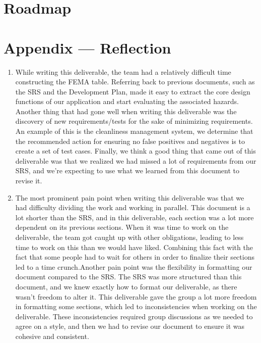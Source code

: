 \documentclass{article}
\begin{document}
\section{Roadmap}


\newpage{}

\section*{Appendix --- Reflection}

\begin{enumerate}
    \item While writing this deliverable, the team had a relatively difficult time constructing the FEMA table. Referring back to previous documents, such as the SRS and the Development Plan, made it easy to extract the core design functions of our application and start evaluating the associated hazards. Another thing that had gone well when writing this deliverable was the discovery of new requirements/tests for the sake of minimizing requirements. An example of this is the cleanliness management system, we determine that the recommended action for ensuring no false positives and negatives is to create a set of test cases. Finally, we think a good thing that came out of this deliverable was that we realized we had missed a lot of requirements from our SRS, and we're expecting to use what we learned from this document to revise it.
    
    \item The most prominent pain point when writing this deliverable was that we had difficulty dividing the work and working in parallel. This document is a lot shorter than the SRS, and in this deliverable, each section was a lot more dependent on its previous sections. When it was time to work on the deliverable, the team got caught up with other obligations, leading to less time to work on this than we would have liked. Combining this fact with the fact that some people had to wait for others in order to finalize their sections led to a time crunch.\newline Another pain point was the flexibility in formatting our document compared to the SRS. The SRS was more structured than this document, and we knew exactly how to format our deliverable, as there wasn't freedom to alter it. This deliverable gave the group a lot more freedom in formatting some sections, which led to inconsistencies when working on the deliverable. These inconsistencies required group discussions as we needed to agree on a style, and then we had to revise our document to ensure it was cohesive and consistent. 
    

\end{enumerate}
\end{document}
